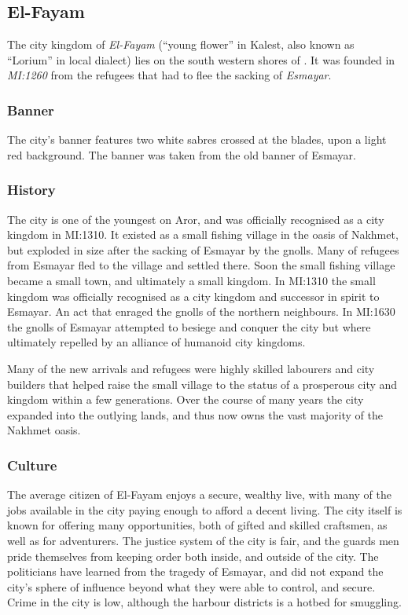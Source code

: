\subsection{El-Fayam}
\label{sec:El-Fayam}

The city kingdom of \emph{El-Fayam} (``young flower'' in Kalest, also known
as ``Lorium'' in local dialect) lies on the south western shores of
. It was founded in \emph{MI:1260} from the refugees that
had to flee the sacking of \emph{Esmayar}.

\subsubsection{Banner}

The city's banner features two white sabres crossed at the blades, upon
a light red background. The banner was taken from the old banner of Esmayar.

\subsubsection{History}

The city is one of the youngest on Aror, and was officially recognised as a
city kingdom in MI:1310. It existed as a small fishing village in the oasis of
Nakhmet, but exploded in size after the sacking of Esmayar by the gnolls. Many
of refugees from Esmayar fled to the village and settled there. Soon the small
fishing village became a small town, and ultimately a small kingdom. In
MI:1310 the small kingdom was officially recognised as a city kingdom and
successor in spirit to Esmayar. An act that enraged the gnolls of the northern
neighbours. In MI:1630 the gnolls of Esmayar attempted to besiege and conquer
the city but where ultimately repelled by an alliance of humanoid city
kingdoms.

Many of the new arrivals and refugees were highly skilled labourers and city
builders that helped raise the small village to the status of a prosperous
city and kingdom within a few generations. Over the course of many years the
city expanded into the outlying lands, and thus now owns the vast majority of
the Nakhmet oasis.

\subsubsection{Culture}

The average citizen of El-Fayam enjoys a secure, wealthy live, with many of
the jobs available in the city paying enough to afford a decent living. The
city itself is known for offering many opportunities, both of gifted and skilled
craftsmen, as well as for adventurers. The justice system of the city is fair,
and the guards men pride themselves from keeping order both inside, and outside
of the city. The politicians have learned from the tragedy of Esmayar, and did
not expand the city's sphere of influence beyond what they were able to control,
and secure. Crime in the city is low, although the harbour districts is a hotbed
for smuggling.

